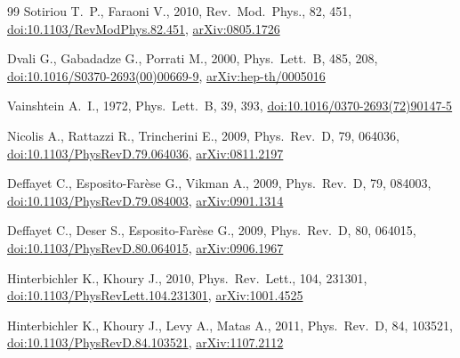 \documentclass[fleqn,usenatbib]{mnras}
\begin{document}
\begin{thebibliography}{99}
Sotiriou T.~P., Faraoni V., 2010, Rev.\ Mod.\ Phys., 82, 451,
\href{https://doi.org/10.1103/RevModPhys.82.451}{doi:10.1103/RevModPhys.82.451},
\href{https://arxiv.org/abs/0805.1726}{arXiv:0805.1726}

Dvali G., Gabadadze G., Porrati M., 2000, Phys.\ Lett.\ B, 485, 208,
\href{https://doi.org/10.1016/S0370-2693(00)00669-9}{doi:10.1016/S0370-2693(00)00669-9},
\href{https://arxiv.org/abs/hep-th/0005016}{arXiv:hep-th/0005016}

Vainshtein A.~I., 1972, Phys.\ Lett.\ B, 39, 393,
\href{https://doi.org/10.1016/0370-2693(72)90147-5}{doi:10.1016/0370-2693(72)90147-5}

Nicolis A., Rattazzi R., Trincherini E., 2009, Phys.\ Rev.\ D, 79, 064036,
\href{https://doi.org/10.1103/PhysRevD.79.064036}{doi:10.1103/PhysRevD.79.064036},
\href{https://arxiv.org/abs/0811.2197}{arXiv:0811.2197}

Deffayet C., Esposito-Far{\`e}se G., Vikman A., 2009, Phys.\ Rev.\ D, 79, 084003,
\href{https://doi.org/10.1103/PhysRevD.79.084003}{doi:10.1103/PhysRevD.79.084003},
\href{https://arxiv.org/abs/0901.1314}{arXiv:0901.1314}

Deffayet C., Deser S., Esposito-Far{\`e}se G., 2009, Phys.\ Rev.\ D, 80, 064015,
\href{https://doi.org/10.1103/PhysRevD.80.064015}{doi:10.1103/PhysRevD.80.064015},
\href{https://arxiv.org/abs/0906.1967}{arXiv:0906.1967}

Hinterbichler K., Khoury J., 2010, Phys.\ Rev.\ Lett., 104, 231301,
\href{https://doi.org/10.1103/PhysRevLett.104.231301}{doi:10.1103/PhysRevLett.104.231301},
\href{https://arxiv.org/abs/1001.4525}{arXiv:1001.4525}

Hinterbichler K., Khoury J., Levy A., Matas A., 2011, Phys.\ Rev.\ D, 84, 103521,
\href{https://doi.org/10.1103/PhysRevD.84.103521}{doi:10.1103/PhysRevD.84.103521},
\href{https://arxiv.org/abs/1107.2112}{arXiv:1107.2112}


\end{thebibliography}
\end{document}
